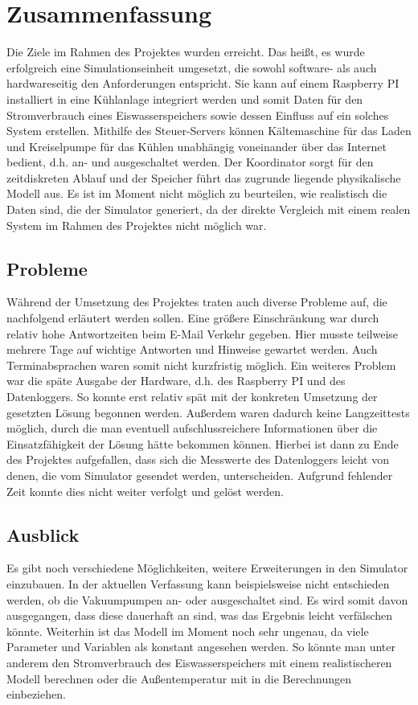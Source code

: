\chapter{Zusammenfassung}
Die Ziele im Rahmen des Projektes wurden erreicht. Das heißt, es wurde erfolgreich eine Simulationseinheit umgesetzt, die sowohl software- als auch hardwareseitig den Anforderungen entspricht. Sie kann auf einem Raspberry PI installiert in eine Kühlanlage integriert werden und somit Daten für den Stromverbrauch eines Eiswasserspeichers sowie dessen Einfluss auf ein solches System erstellen.
Mithilfe des Steuer-Servers können Kältemaschine für das Laden und Kreiselpumpe für das Kühlen unabhängig voneinander über das Internet bedient, d.h. an- und ausgeschaltet werden. Der Koordinator sorgt für den zeitdiskreten Ablauf und der Speicher führt das zugrunde liegende physikalische Modell aus.
Es ist im Moment nicht möglich zu beurteilen, wie realistisch die Daten sind, die der Simulator generiert, da der direkte Vergleich mit einem realen System im Rahmen des Projektes nicht möglich war.

\section{Probleme}
Während der Umsetzung des Projektes traten auch diverse Probleme auf, die nachfolgend erläutert werden sollen. Eine größere Einschränkung war durch relativ hohe Antwortzeiten beim E-Mail Verkehr gegeben. Hier musste teilweise mehrere Tage auf wichtige Antworten und Hinweise gewartet werden. Auch Terminabsprachen waren somit nicht kurzfristig möglich. Ein weiteres Problem war die späte Ausgabe der Hardware, d.h. des Raspberry PI und des Datenloggers. So konnte erst relativ spät mit der konkreten Umsetzung der gesetzten Lösung begonnen werden. Außerdem waren dadurch keine Langzeittests möglich, durch die man eventuell aufschlussreichere Informationen über die Einsatzfähigkeit der Lösung hätte bekommen können. Hierbei ist dann zu Ende des Projektes aufgefallen, dass sich die Messwerte des Datenloggers leicht von denen, die vom Simulator gesendet werden, unterscheiden. Aufgrund fehlender Zeit konnte dies nicht weiter verfolgt und gelöst werden.

\section{Ausblick}
Es gibt noch verschiedene Möglichkeiten, weitere Erweiterungen in den Simulator einzubauen. In der aktuellen Verfassung kann beispielsweise nicht entschieden werden, ob die Vakuumpumpen an- oder ausgeschaltet sind. Es wird somit davon ausgegangen, dass diese dauerhaft an sind, was das Ergebnis leicht verfälschen könnte. Weiterhin ist das Modell im Moment noch sehr ungenau, da viele Parameter und Variablen als konstant angesehen werden. So könnte man unter anderem den Stromverbrauch des Eiswasserspeichers mit einem realistischeren Modell berechnen oder die Außentemperatur mit in die Berechnungen einbeziehen. %